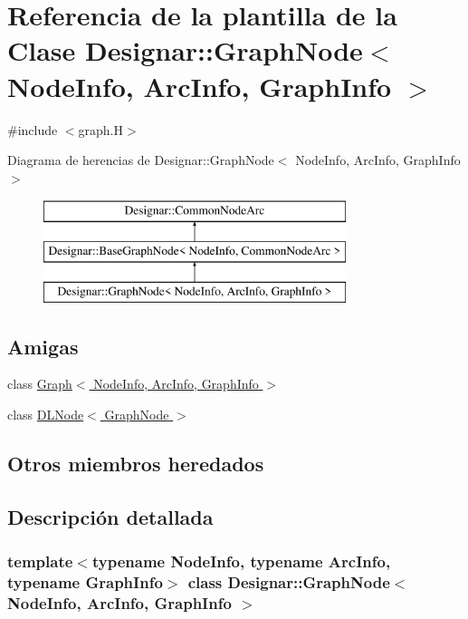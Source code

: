 \hypertarget{class_designar_1_1_graph_node}{}\section{Referencia de la plantilla de la Clase Designar\+:\+:Graph\+Node$<$ Node\+Info, Arc\+Info, Graph\+Info $>$}
\label{class_designar_1_1_graph_node}


{\ttfamily \#include $<$graph.\+H$>$}

Diagrama de herencias de Designar\+:\+:Graph\+Node$<$ Node\+Info, Arc\+Info, Graph\+Info $>$\begin{figure}[H]
\begin{center}
\leavevmode
\includegraphics[height=3.000000cm]{class_designar_1_1_graph_node}
\end{center}
\end{figure}
\subsection*{Amigas}
\begin{DoxyCompactItemize}
\item 
class \hyperlink{class_designar_1_1_graph_node_a0a9834688687d864501bbb9c85b0d32c}{Graph$<$ Node\+Info, Arc\+Info, Graph\+Info $>$}
\item 
class \hyperlink{class_designar_1_1_graph_node_a5d0e7b51039a0eb5cfdfdb2f3701f06d}{D\+L\+Node$<$ Graph\+Node $>$}
\end{DoxyCompactItemize}
\subsection*{Otros miembros heredados}


\subsection{Descripción detallada}
\subsubsection*{template$<$typename Node\+Info, typename Arc\+Info, typename Graph\+Info$>$\newline
class Designar\+::\+Graph\+Node$<$ Node\+Info, Arc\+Info, Graph\+Info $>$}



